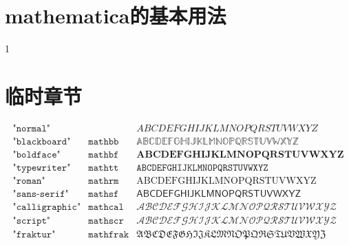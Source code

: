 \documentclass[lang=cn,newtx,10pt,scheme=chinese,thmcnt=section]{elegantbook}
\begin{document}
\chapter{mathematica的基本用法}
1
\chapter{临时章节}
\begin{equation}
\begin{array}{ll|l}
	\texttt{"normal"}      &\texttt{}         & ABCDEFGHIJKLMNOPQRSTUVWXYZ\\
	\texttt{"blackboard"}  &\texttt{mathbb}  &\mathbb{ABCDEFGHIJKLMNOPQRSTUVWXYZ}\\
	\texttt{"boldface"}    &\texttt{mathbf}  &\mathbf{ABCDEFGHIJKLMNOPQRSTUVWXYZ}\\
	\texttt{"typewriter"}  &\texttt{mathtt}  &\mathtt{ABCDEFGHIJKLMNOPQRSTUVWXYZ}\\
	\texttt{"roman"}       &\texttt{mathrm}  &\mathrm{ABCDEFGHIJKLMNOPQRSTUVWXYZ}\\
	\texttt{"sans-serif"}  &\texttt{mathsf}  &\mathsf{ABCDEFGHIJKLMNOPQRSTUVWXYZ}\\
	\texttt{"calligraphic"}&\texttt{mathcal} &\mathcal{ABCDEFGHIJKLMNOPQRSTUVWXYZ}\\
	\texttt{"script"}      &\texttt{mathscr} &\mathscr{ABCDEFGHIJKLMNOPQRSTUVWXYZ}\\
	\texttt{"fraktur"}     &\texttt{mathfrak}&\mathfrak{ABCDEFGHIJKLMNOPQRSTUVWXYZ}\\
\end{array}
\end{equation}
\end{document}
